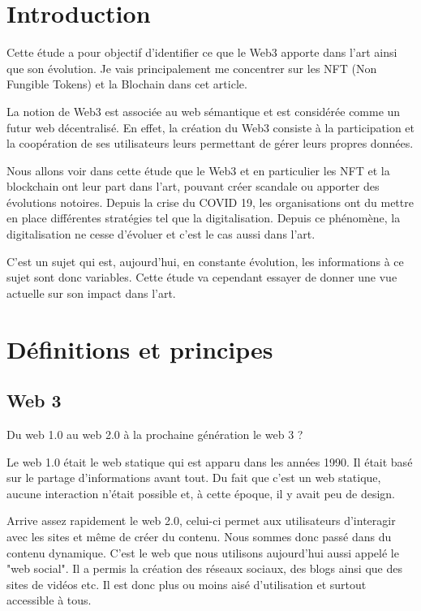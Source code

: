 \documentclass[11pt]{article}
\begin{document}
\break
\tableofcontents
\break



\section{Introduction} %
Cette étude a pour objectif d'identifier ce que le Web3 apporte dans l'art ainsi que son évolution. Je vais principalement me concentrer sur les NFT (Non Fungible Tokens) et la Blochain dans cet article.

La notion de Web3 est associée au web sémantique et est considérée comme un futur web décentralisé. En effet, la création du Web3 consiste à la participation et la coopération de ses utilisateurs leurs permettant de gérer leurs propres données. 

Nous allons voir dans cette étude que le Web3 et en particulier les NFT et la blockchain ont leur part dans l'art, pouvant créer scandale ou apporter des évolutions notoires. Depuis la crise du COVID 19, les organisations ont du mettre en place différentes stratégies tel que la digitalisation. Depuis ce phénomène, la digitalisation ne cesse d'évoluer et c'est le cas aussi dans l'art.

C'est un sujet qui est, aujourd'hui, en constante évolution, les informations à ce sujet sont donc variables. Cette étude va cependant essayer de donner une vue actuelle sur son impact dans l'art. 
\section{Définitions et principes} %
\subsection{Web 3} %
Du web 1.0 au web 2.0 à la prochaine génération le web 3 ?

Le web 1.0 était le web statique qui est apparu dans les années 1990. Il était basé sur le partage d'informations avant tout. Du fait que c'est un web statique, aucune interaction n'était possible et, à cette époque, il y avait peu de design. 

Arrive assez rapidement le web 2.0, celui-ci permet aux utilisateurs d'interagir avec les sites et même de créer du contenu. Nous sommes donc passé dans du contenu dynamique. C'est le web que nous utilisons aujourd'hui aussi appelé le "web social". Il a permis la création des réseaux sociaux, des blogs ainsi que des sites de vidéos etc. Il est donc plus ou moins aisé d'utilisation et surtout accessible à tous. \cite{barassi_does_2012}
\end{document}
